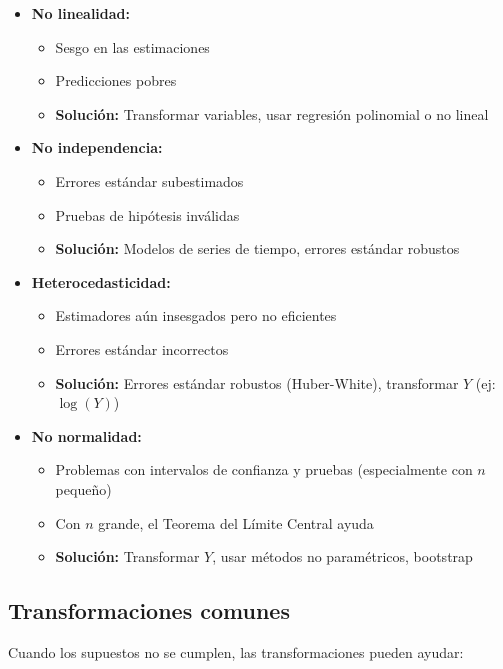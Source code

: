 \begin{itemize}
	\item \textbf{No linealidad:}
	\begin{itemize}
		\item Sesgo en las estimaciones
		\item Predicciones pobres
		\item \textbf{Solución:} Transformar variables, usar regresión polinomial o no lineal
	\end{itemize}
	
	\item \textbf{No independencia:}
	\begin{itemize}
		\item Errores estándar subestimados
		\item Pruebas de hipótesis inválidas
		\item \textbf{Solución:} Modelos de series de tiempo, errores estándar robustos
	\end{itemize}
	
	\item \textbf{Heterocedasticidad:}
	\begin{itemize}
		\item Estimadores aún insesgados pero no eficientes
		\item Errores estándar incorrectos
		\item \textbf{Solución:} Errores estándar robustos (Huber-White), transformar $Y$ (ej: $\log(Y)$)
	\end{itemize}
	
	\item \textbf{No normalidad:}
	\begin{itemize}
		\item Problemas con intervalos de confianza y pruebas (especialmente con $n$ pequeño)
		\item Con $n$ grande, el Teorema del Límite Central ayuda
		\item \textbf{Solución:} Transformar $Y$, usar métodos no paramétricos, bootstrap
	\end{itemize}
\end{itemize}

\subsection{Transformaciones comunes}

Cuando los supuestos no se cumplen, las transformaciones pueden ayudar:

